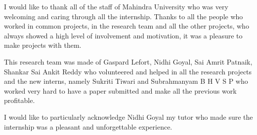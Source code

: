 I would like to thank all of the staff of Mahindra University who was very
welcoming and caring through all the internship. Thanks to all the people who
worked in common projects, in the research team and all the other projects, who
always showed a high level of involvement and motivation, it was a pleasure to
make projects with them.

This research team was made of Gaspard Lefort, Nidhi Goyal, Sai Amrit Patnaik,
Shankar Sai Ankit Reddy who volunteered and helped in all the research projects
and the new interns, namely Sukriti Tiwari and Subrahmanyam B H V S P who worked
very hard to have a paper submitted and make all the previous work profitable.

I would like to particularly acknowledge Nidhi Goyal my tutor who made sure the
internship was a pleasant and unforgettable experience.